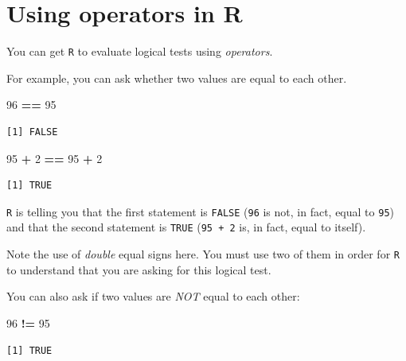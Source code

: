 \documentclass[
]{book}
\newenvironment{Shaded}{\begin{snugshade}}{\end{snugshade}}
\newcommand{\DecValTok}[1]{\textcolor[rgb]{0.00,0.00,0.81}{#1}}
\newcommand{\OperatorTok}[1]{\textcolor[rgb]{0.81,0.36,0.00}{\textbf{#1}}}
\newcommand{\StringTok}[1]{\textcolor[rgb]{0.31,0.60,0.02}{#1}}
\begin{document}
\hypertarget{using-operators-in-r}{%
\section{Using operators in R}\label{using-operators-in-r}}

You can get \texttt{R} to evaluate logical tests using \emph{operators}.

For example, you can ask whether two values are equal to each other.

\begin{Shaded}
\begin{Highlighting}[]
\DecValTok{96} \OperatorTok{==}\StringTok{ }\DecValTok{95}
\end{Highlighting}
\end{Shaded}

\begin{verbatim}
[1] FALSE
\end{verbatim}

\begin{Shaded}
\begin{Highlighting}[]
\DecValTok{95} \OperatorTok{+}\StringTok{ }\DecValTok{2} \OperatorTok{==}\StringTok{ }\DecValTok{95} \OperatorTok{+}\StringTok{ }\DecValTok{2}
\end{Highlighting}
\end{Shaded}

\begin{verbatim}
[1] TRUE
\end{verbatim}

\texttt{R} is telling you that the first statement is \texttt{FALSE} (\texttt{96} is not, in fact, equal to \texttt{95}) and that the second statement is \texttt{TRUE} (\texttt{95\ +\ 2} is, in fact, equal to itself).

Note the use of \emph{double} equal signs here. You must use two of them in order for \texttt{R} to understand that you are asking for this logical test.

You can also ask if two values are \emph{NOT} equal to each other:

\begin{Shaded}
\begin{Highlighting}[]
\DecValTok{96} \OperatorTok{!=}\StringTok{ }\DecValTok{95}
\end{Highlighting}
\end{Shaded}

\begin{verbatim}
[1] TRUE
\end{verbatim}
\end{document}
